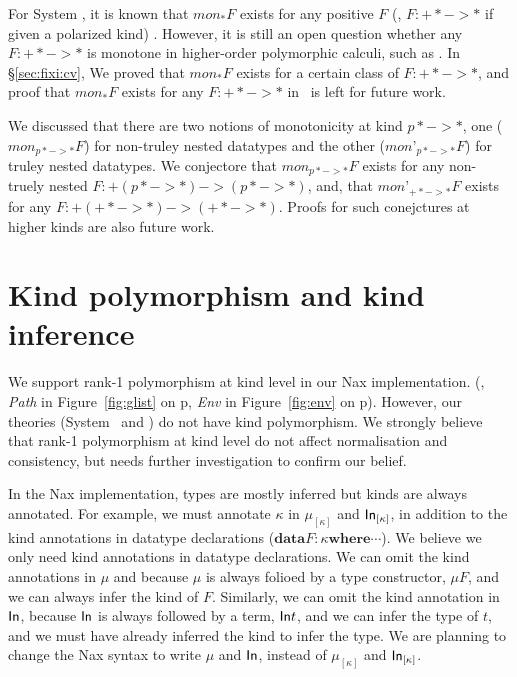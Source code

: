 For System \F, it is known that $mon_{*}F$ exists for any positive $F$
(\ie, $F:+* -> *$ if given a polarized kind) \cite{Mat99}. However,
it is still an open question whether any $F:+* -> *$ is monotone
in higher-order polymorphic calculi, such as \Fixi. In \S\ref{sec:fixi:cv},
We proved that $mon_{*}F$ exists for a certain class of $F:+* -> *$,
and proof that $mon_{*}F$ exists for any $F:+* -> *$ in \Fixi\ is
left for future work.

We discussed that there are two notions of monotonicity at kind $p* -> *$,
one ($\textit{mon}_{p* -> *}F$) for non-truley nested datatypes and
the other ($\textit{mon'}_{p* -> *}F$) for truley nested datatypes.
We conjectore that $\textit{mon}_{p* -> *}F$ exists for any non-truely nested
$F:+(p* -> *) -> (p* -> *)$, and, that $\textit{mon'}_{+* -> *}F$ exists
for any $F:+(+* -> *) -> (+* -> *)$. Proofs for such conejctures
at higher kinds are also future work.

\section{Kind polymorphism and kind inference}\label{sec:futwork:kindpoly}
We support rank-1 polymorphism at kind level in our Nax implementation.
(\eg, \textit{Path} in Figure~\ref{fig:glist} on p\pageref{fig:glist},
      \textit{Env} in Figure~\ref{fig:env} on p\pageref{fig:env}).
However, our theories (System \Fi\ and \Fixi) do not have kind polymorphism.
We strongly believe that rank-1 polymorphism at kind level do not affect
normalisation and consistency, but needs further investigation to confirm
our belief.

In the Nax implementation, types are mostly inferred but kinds are always
annotated. For example, we must annotate $\kappa$ in $\mu_{[\kappa]}$ and
$\mathsf{In}_{[\kappa]}$, in addition to the kind annotations in datatype declarations
($\mathbf{data} F : \kappa \mathbf{where} \cdots$). We believe we only
need kind annotations in datatype declarations. We can omit the kind
annotations in $\mu$ and because $\mu$ is always folioed by a type constructor,
$\mu F$, and we can always infer the kind of $F$. Similarly, we can omit
the kind annotation in $\mathsf{In}$, because $\mathsf{In}$ is always followed by a term,
$\mathsf{In} t$, and we can infer the type of $t$, and we must have already inferred
the kind to infer the type. We are planning to change the Nax syntax
to write $\mu$ and $\mathsf{In}$, instead of $\mu_{[\kappa]}$ and $\mathsf{In}_{[\kappa]}$.

